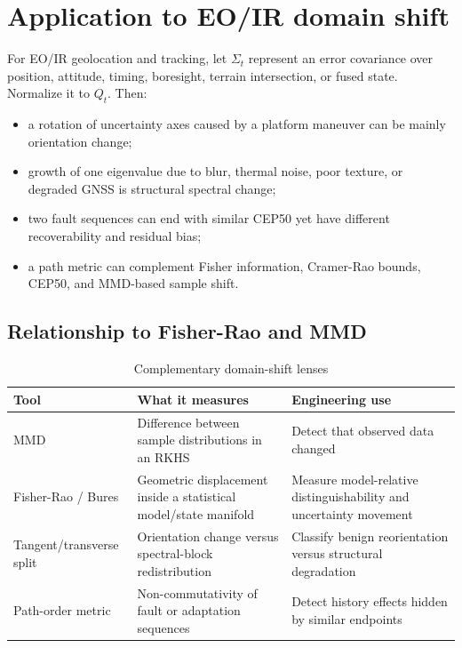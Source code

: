 \section{Application to EO/IR domain shift}

For EO/IR geolocation and tracking, let $\Sigma_t$ represent an error covariance over position, attitude, timing, boresight, terrain intersection, or fused state. Normalize it to $Q_t$. Then:

\begin{itemize}
  \item a rotation of uncertainty axes caused by a platform maneuver can be mainly orientation change;
  \item growth of one eigenvalue due to blur, thermal noise, poor texture, or degraded GNSS is structural spectral change;
  \item two fault sequences can end with similar CEP50 yet have different recoverability and residual bias;
  \item a path metric can complement Fisher information, Cramer-Rao bounds, CEP50, and MMD-based sample shift.
\end{itemize}

\subsection{Relationship to Fisher-Rao and MMD}

\begin{table}[H]
\centering
\caption{Complementary domain-shift lenses}
\begin{tabularx}{\textwidth}{p{} X X}
\toprule
\textbf{Tool} & \textbf{What it measures} & \textbf{Engineering use} \\
\midrule
MMD \citep{gretton2012} & Difference between sample distributions in an RKHS & Detect that observed data changed \\
Fisher-Rao / Bures \citep{amari2016,hubner1992} & Geometric displacement inside a statistical model/state manifold & Measure model-relative distinguishability and uncertainty movement \\
Tangent/transverse split & Orientation change versus spectral-block redistribution & Classify benign reorientation versus structural degradation \\
Path-order metric & Non-commutativity of fault or adaptation sequences & Detect history effects hidden by similar endpoints \\
\bottomrule
\end{tabularx}
\end{table}

